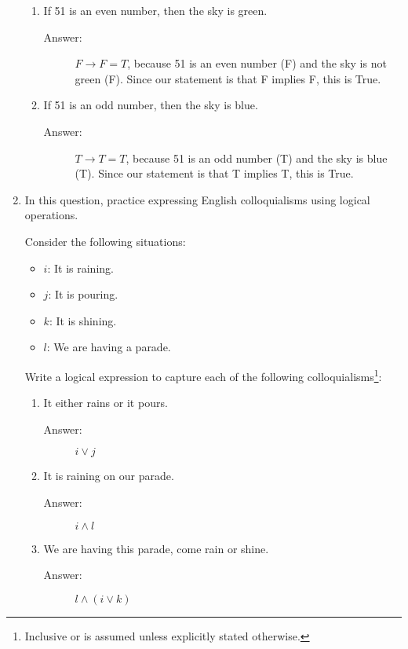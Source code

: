 \documentclass[12pt, oneside]{article}
\begin{document}
\begin{enumerate}
\begin{enumerate}
    \item If 51 is an even number, then the sky is green.
    \begin{description}
        \item[Answer:] $F \rightarrow F = T$, because 51 is an even number (F) and the sky is not green (F). Since our statement is that F implies F, this is True.
    \end{description}
    \item If 51 is an odd number, then the sky is blue.
    \begin{description}
        \item[Answer:] $T \rightarrow T = T$, because 51 is an odd number (T) and the sky is blue (T). Since our statement is that T implies T, this is True.
    \end{description}
\end{enumerate}


\item In this question, practice expressing English colloquialisms using logical operations.

Consider the following situations:
\begin{itemize}
    \item $i$: It is raining.
    \item $j$: It is pouring.
    \item $k$: It is shining.
    \item $l$: We are having a parade.

\end{itemize}

Write a logical expression to capture each of the following colloquialisms\footnote{Inclusive or is assumed unless explicitly stated otherwise.}:%
\begin{enumerate} %

    \item It either rains or it pours. 
    \begin{description}
        \item[Answer:] $i \lor j$
    \end{description}
    \item It is raining on our parade. 
    \begin{description}
        \item[Answer:] $i \land l$
    \end{description}
    \item We are having this parade, come rain or shine. 
    \begin{description}
        \item[Answer:] $l \land (i \lor k)$
    \end{description}



\end{enumerate}
\end{enumerate}
\end{document}
